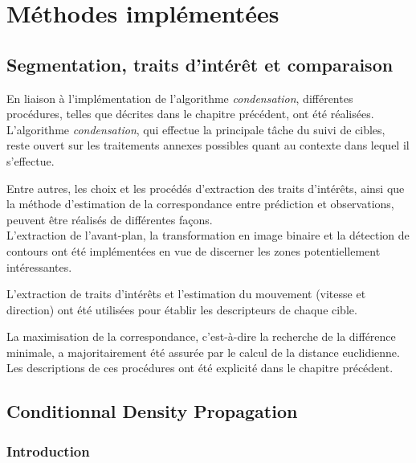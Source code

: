 \documentclass[a4paper,11pt]{report}
\begin{document}
\pagebreak
\chapter{Méthodes implémentées}

\section{Segmentation, traits d'intérêt et comparaison}
En liaison à l'implémentation de l'algorithme \textit{condensation}, différentes procédures, telles que décrites dans le chapitre précédent, ont été réalisées.\\

L'algorithme \textit{condensation}, qui effectue la principale tâche du suivi de cibles, reste ouvert sur les traitements annexes possibles quant au contexte dans lequel il s'effectue. 

Entre autres, les choix et les procédés d'extraction des traits d'intérêts, ainsi que la méthode d'estimation de la correspondance entre prédiction et observations, peuvent être réalisés de différentes façons.\\

L'extraction de l'avant-plan, la transformation en image binaire et la détection de contours ont été implémentées en vue de discerner les zones potentiellement intéressantes.

L'extraction de traits d'intérêts et l'estimation du mouvement (vitesse et direction) ont été utilisées pour établir les descripteurs de chaque cible.

La maximisation de la correspondance, c'est-à-dire la recherche de la différence minimale, a majoritairement été assurée par le calcul de la distance euclidienne.\\

Les descriptions de ces procédures ont été explicité dans le chapitre précédent.


\section{Conditionnal Density Propagation}
\subsection{Introduction}
\end{document}
